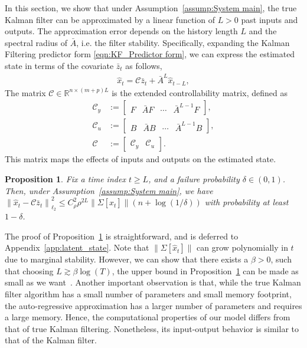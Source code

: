 \documentclass[11pt]{article}
\newtheorem{proposition}{Proposition}
\renewcommand{\cite}{\citep}
\newcommand{\Abar}{\bar{A}}
\newcommand{\zbar}{\bar{z}}
\newcommand{\xtil}{\hat{x}}
\newcommand{\Ccal}{\mathcal{C}}
\newcommand{\Hcal}{\mathcal{H}}
\newcommand{\Ocal}{\mathcal{O}}
\newcommand{\Tcal}{\mathcal{T}}
\newcommand{\tn}[1]{\left\|{#1}\right\|_{\ell_2}}
\newcommand{\norm}[1]{\|{#1} \|}
\newcommand{\R}{\mathbb{R}}				%
\newcommand{\<}{\langle}
\renewcommand{\>}{\rangle}
\numberwithin{equation}{section}
\begin{document}
In this section, we show that under Assumption~\ref{assump:System main}, the true Kalman filter can be approximated by a linear function of $L>0$ past inputs and outputs. The approximation error depends on the history length $L$ and the spectral radius of $\Abar$, i.e. the filter stability. Specifically, expanding the Kalman Filtering predictor form \eqref{eqn:KF_Predictor form}, we can express the estimated state in terms of the covariate $\zbar_t$ as follows,
\begin{equation}
\begin{aligned}\label{eqn:ARKF}
    \xtil_t  =  \Ccal \zbar_t + \Abar^L \xtil_{t-L} ,
\end{aligned}
\end{equation}
 The matrix $\Ccal \in \R^{n \times (m+p)L}$ is the extended controllability matrix,
 defined as
\begin{align*}
\Ccal_y &:= \begin{bmatrix} 
    F & \Abar F & \cdots &\Abar^{L-1} F \end{bmatrix},\\
    \Ccal_u &:= \begin{bmatrix} 
    B & \Abar B & \cdots &\Abar^{L-1} B   \end{bmatrix},\\
    \Ccal &:= \begin{bmatrix} 
    \Ccal_y & \Ccal_u \end{bmatrix}.
\end{align*}
This matrix maps the effects of inputs and outputs on the estimated state.

 

\begin{proposition}\label{prop:approximation} Fix a time index $t \geq L$, and a failure probability $\delta \in (0,1)$. Then, under Assumption~\ref{assump:System main}, we have $\tn{\xtil_t -  \Ccal \zbar_t}^2 \leq C_{\rho}^2 \rho^{2L} \norm{\Sigma[\xtil_t]} \left(n + \log (1/\delta)\right)$ with probability at least $1-\delta$.
\end{proposition}
The proof of Proposition~\ref{prop:approximation} is straightforward, and is deferred to Appendix~\ref{app:latent_state}. Note that $\norm{\Sigma[\xtil_t]}$ can grow polynomially in $t$ due to marginal stability. However, we can show that there exists a $\beta>0$, such that choosing $L\gtrsim \beta \log(T)$, the upper bound in Proposition~\ref{prop:approximation} can be made as small as we want~\cite{ziemann2023tutorial}. Another important observation is that, while the true Kalman filter algorithm has a small number of parameters and small memory footprint, the auto-regressive approximation has a larger number of parameters and requires a large memory. 
Hence, the computational properties of our model differs from that of true Kalman filtering.
Nonetheless, its input-output behavior is  similar to that of the Kalman filter.
\end{document}
